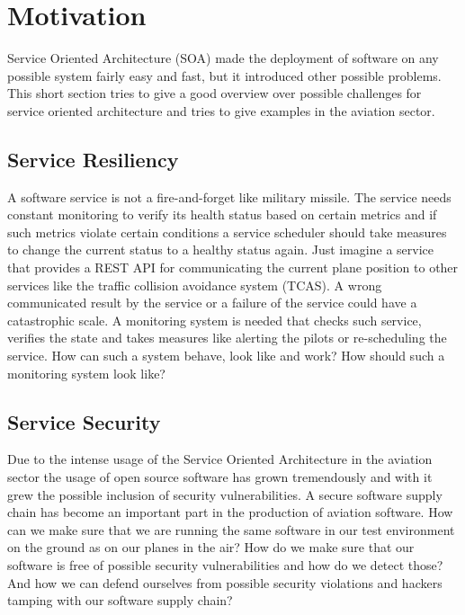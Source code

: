 \documentclass[conference]{IEEEtran}
\begin{document}
\section*{Motivation}
Service Oriented Architecture (SOA) made the deployment of software on any possible 
system fairly easy and fast, but it introduced other possible problems. This short
section tries to give a good overview over possible challenges for service oriented
architecture and tries to give examples in the aviation sector.

\subsection{Service Resiliency}
A software service is not a fire-and-forget like military missile. The service
needs constant monitoring to verify its health status based on certain metrics
and if such metrics violate certain conditions a service scheduler should
take measures to change the current status to a healthy status again. Just imagine
a service that provides a REST API for communicating the current plane position
to other services like the traffic collision avoidance system (TCAS). A wrong communicated
result by the service or a failure of the service could have a catastrophic scale.
A monitoring system is needed that checks such service, verifies the state and takes
measures like alerting the pilots or re-scheduling the service. How can such
a system behave, look like and work? How should such a monitoring system look like?

\subsection{Service Security}
Due to the intense usage of the Service Oriented Architecture in the aviation sector
the usage of open source software has grown tremendously and with it grew
the possible inclusion of security vulnerabilities. A secure software supply chain
has become an important part in the production of aviation software. How can we make
sure that we are running the same software in our test environment on the ground
as on our planes in the air? How do we make sure that our software is free of possible
security vulnerabilities and how do we detect those? And how we can defend ourselves
from possible security violations and hackers tamping with our software supply chain?
\end{document}
